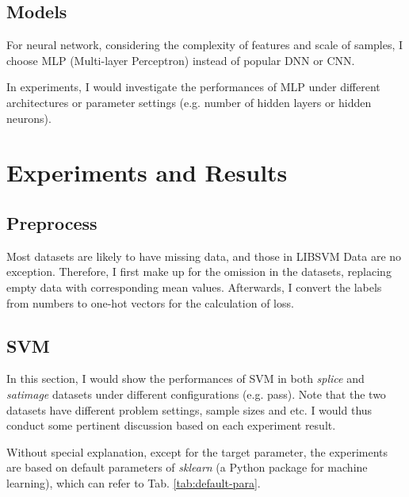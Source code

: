 \documentclass[12pt,a4paper]{article}
\theoremstyle{definition}
\begin{document}
\subsection{Models}

For neural network, considering the complexity of features and scale of samples, I choose MLP (Multi-layer Perceptron) instead of popular DNN or CNN.

\vspace{0.01\linewidth}
In experiments, I would investigate the performances of MLP under different architectures or parameter settings (e.g. number of hidden layers or hidden neurons).

\section{Experiments and Results}

\subsection{Preprocess}

Most datasets are likely to have missing data, and those in LIBSVM Data are no exception. Therefore, I first make up for the omission in the datasets, replacing empty data with corresponding mean values. Afterwards, I convert the labels from numbers to one-hot vectors for the calculation of loss.

\subsection{SVM}
\label{sec:svm}

In this section, I would show the performances of SVM in both \textit{splice} and \textit{satimage} datasets under different configurations (e.g. pass). Note that the two datasets have different problem settings, sample sizes and etc. I would thus conduct some pertinent discussion based on each experiment result.

\vspace{0.01\linewidth}
Without special explanation, except for the target parameter, the experiments are based on default parameters of \textit{sklearn} \cite{sklearn} (a Python package for machine learning), which can refer to Tab. \ref{tab:default-para}.
\end{document}

